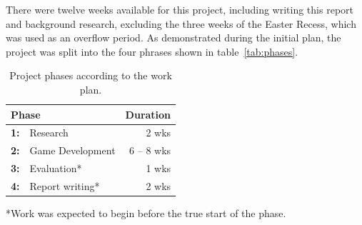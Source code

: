 %

There were twelve weeks available for this project, including writing this report and background research, excluding the three weeks of the Easter Recess, which was used as an overflow period. As demonstrated during the initial plan, the project was split into the four phrases shown in table~\autoref{tab:phases}.


\begin{table}[h]
    \centering
    \begin{tabular}{llr}
        \toprule
        \multicolumn{2}{l}{\textbf{Phase}} & Duration\\
        \midrule
        \textbf{1:} & Research  & 2 wks\\
        \textbf{2:} & Game Development  & 6 -- 8 wks\\
        \textbf{3:} & Evaluation*  & 1 wks\\
        \textbf{4:} & Report writing* & 2 wks
        \\ \bottomrule
    \end{tabular}
    \newline
    \vspace*{0.75\baselineskip}
    *Work was expected to begin before the true start of the phase.
    \newline
    \caption{Project phases according to the work plan.}
    \label{tab:phases}
\end{table}

